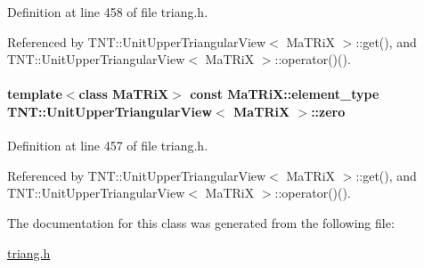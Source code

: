 Definition at line 458 of file triang.h.



Referenced by TNT::UnitUpperTriangularView$<$ MaTRiX $>$::get(), and TNT::UnitUpperTriangularView$<$ MaTRiX $>$::operator()().

\paragraph[{zero}]{\setlength{\rightskip}{0pt plus 5cm}template$<$class MaTRiX$>$ const MaTRiX::element\_\-type {\bf TNT::UnitUpperTriangularView}$<$ MaTRiX $>$::{\bf zero}}\hfill\label{class_t_n_t_1_1_unit_upper_triangular_view_a08687da748789af9a276efddf41d6cf4}


Definition at line 457 of file triang.h.



Referenced by TNT::UnitUpperTriangularView$<$ MaTRiX $>$::get(), and TNT::UnitUpperTriangularView$<$ MaTRiX $>$::operator()().



The documentation for this class was generated from the following file:\begin{DoxyCompactItemize}
\item 
\hyperlink{triang_8h}{triang.h}\end{DoxyCompactItemize}
